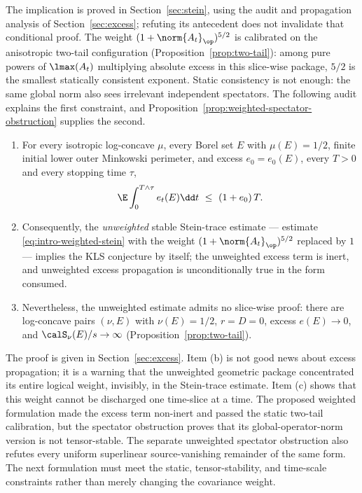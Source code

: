 \documentclass[../../main.tex]{subfiles}
\begin{document}
The implication is proved in Section~\ref{sec:stein}, using the audit and propagation analysis
of Section~\ref{sec:excess}; refuting its antecedent does not invalidate that conditional proof.
The weight $(1+\norm{A_t}_\op)^{5/2}$ is calibrated on the anisotropic two-tail configuration
(Proposition~\ref{prop:two-tail}): among pure powers of $\lmax(A_t)$ multiplying absolute excess
in this slice-wise package, $5/2$ is the smallest statically consistent exponent. Static
consistency is not enough: the same global norm also sees irrelevant independent spectators.
The following audit explains the first constraint, and
Proposition~\ref{prop:weighted-spectator-obstruction} supplies the second.

\begin{proposition}
\label{prop:intro-audit}
\leavevmode
\begin{enumerate}[label=(\alph*),leftmargin=2.2em]
\item For every isotropic log-concave $\mu$, every Borel set $E$ with $\mu(E)=1/2$, finite
initial lower outer Minkowski perimeter, and excess $e_0=e_0(E)$, every $T>0$ and every
stopping time $\tau$,
\[
  \E\int_0^{T\wedge\tau}e_t(E)\dd t\ \le\ (1+e_0)\,T .
\]
\item Consequently, the \emph{unweighted} stable Stein-trace estimate --- estimate
\eqref{eq:intro-weighted-stein} with the weight $(1+\norm{A_t}_\op)^{5/2}$ replaced by $1$ ---
implies the KLS conjecture by itself; the unweighted excess term is inert, and unweighted excess
propagation is unconditionally true in the form consumed.
\item Nevertheless, the unweighted estimate admits no slice-wise proof: there are log-concave
pairs $(\nu,E)$ with $\nu(E)=1/2$, $r=D=0$, excess $e(E)\to0$, and $\calS_\nu(E)/s\to\infty$
(Proposition~\ref{prop:two-tail}).
\end{enumerate}
\end{proposition}

The proof is given in Section~\ref{sec:excess}. Item (b) is not good news about excess
propagation; it is a warning that the unweighted geometric package concentrated its entire
logical weight, invisibly, in the Stein-trace estimate. Item (c) shows that this weight cannot be
discharged one time-slice at a time. The proposed weighted formulation made the excess term
non-inert and passed the static two-tail calibration, but the spectator obstruction proves that
its global-operator-norm version is not tensor-stable. The separate unweighted spectator
obstruction also refutes every uniform superlinear source-vanishing remainder of the same form.
The next formulation must meet the static, tensor-stability, and time-scale constraints rather
than merely changing the covariance weight.
\end{document}
